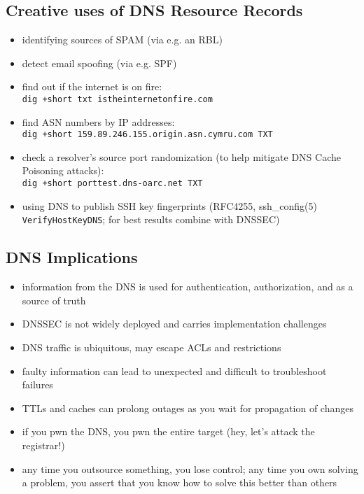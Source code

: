 \documentclass[xga]{xdvislides}
\begin{document}
\subsection{Creative uses of DNS Resource Records}
\begin{itemize}
	\item identifying sources of SPAM (via e.g. an RBL)
	\item detect email spoofing (via e.g. SPF)
	\item find out if the internet is on fire: \\
		\verb|dig +short txt istheinternetonfire.com|
	\item find ASN numbers by IP addresses: \\
		\verb|dig +short 159.89.246.155.origin.asn.cymru.com TXT|
	\item check a resolver's source port randomization (to help
		mitigate DNS Cache Poisoning attacks): \\
		\verb|dig +short porttest.dns-oarc.net TXT|
	\item using DNS to publish SSH key fingerprints (RFC4255,
ssh\_config(5) \verb+VerifyHostKeyDNS+; for best results combine with DNSSEC)
\end{itemize}

\subsection{DNS Implications}

\begin{itemize}
	\item information from the DNS is used for authentication,
		authorization, and as a source of truth
	\item DNSSEC is not widely deployed and
		carries implementation challenges
	\item DNS traffic is ubiquitous, may escape
		ACLs and restrictions
	\item faulty information can lead to
		unexpected and difficult to troubleshoot
		failures
	\item TTLs and caches can prolong outages as
		you wait for propagation of changes
	\item if you pwn the DNS, you pwn the entire
		target (hey, let's attack the registrar!)
	\item any time you outsource something, you
		lose control; any time you own solving
		a problem, you assert that you know
		how to solve this better than others
\end{itemize}
\end{document}
